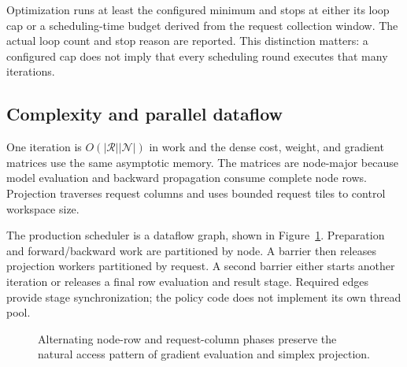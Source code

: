 \documentclass[10pt]{article}
\begin{document}
Optimization runs at least the configured minimum and stops at either its loop
cap or a scheduling-time budget derived from the request collection window.
The actual loop count and stop reason are reported. This distinction matters:
a configured cap does not imply that every scheduling round executes that
many iterations.

\subsection{Complexity and parallel dataflow}

One iteration is $O(|\mathcal{R}||\mathcal{N}|)$ in work and the dense cost,
weight, and gradient matrices use the same asymptotic memory. The matrices are
node-major because model evaluation and backward propagation consume complete
node rows. Projection traverses request columns and uses bounded request tiles
to control workspace size.

The production scheduler is a dataflow graph, shown in
Figure~\ref{fig:optimizer-graph}. Preparation and forward/backward work are
partitioned by node. A barrier then releases projection workers partitioned by
request. A second barrier either starts another iteration or releases a final
row evaluation and result stage. Required edges provide stage synchronization;
the policy code does not implement its own thread pool.

\begin{figure}[t]
\centering
{}
\caption{Alternating node-row and request-column phases preserve the natural
access pattern of gradient evaluation and simplex projection.}
\label{fig:optimizer-graph}
\end{figure}
\end{document}
